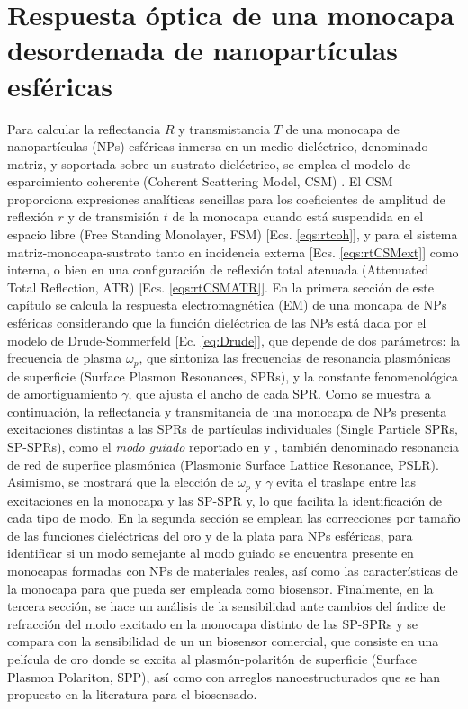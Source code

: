 \chapter{Respuesta óptica de una monocapa desordenada de nanopartículas esféricas}
\label{chapter:Resultados}


Para calcular la reflectancia $R$ y transmistancia $T$  de una monocapa de nanopartículas (NPs) esféricas inmersa en un medio dieléctrico, denominado matriz, y soportada sobre un sustrato dieléctrico, se emplea el modelo de esparcimiento coherente (Coherent Scattering Model, CSM) \cite{reyes2018analytical,garcia2012multiple}. El CSM proporciona expresiones analíticas sencillas para los coeficientes de amplitud de reflexión $r$ y de transmisión $t$ de la monocapa cuando está suspendida en el espacio libre (Free Standing Monolayer, FSM) [Ecs. \eqref{eqs:rtcoh}], y para el sistema matriz-monocapa-sustrato tanto en incidencia externa [Ecs. \eqref{eqs:rtCSMext}] como interna, o bien en una configuración de reflexión total atenuada  (Attenuated Total Reflection, ATR) [Ecs. \eqref{eqs:rtCSMATR}]. En la primera sección de este capítulo se calcula la respuesta electromagnética (EM) de una moncapa de NPs esféricas considerando que la función dieléctrica de las NPs está dada por el modelo de Drude-Sommerfeld [Ec. \eqref{eq:Drude}], que depende de dos parámetros: la frecuencia de plasma $\omega_p$, que sintoniza las frecuencias de resonancia plasmónicas de superficie (Surface Plasmon Resonances, SPRs), y la constante fenomenológica de amortiguamiento $\gamma$, que ajusta el ancho de cada SPR. Como se muestra a continuación, la reflectancia y transmitancia de una monocapa de NPs presenta excitaciones distintas a las  SPRs de partículas individuales (Single Particle SPRs, SP-SPRs), como el \emph{modo guiado} reportado en \cite{kabashin2009plasmonic} y \cite{danilov2018ultra}, también denominado resonancia de red de superfice plasmónica (Plasmonic Surface Lattice Resonance, PSLR). Asimismo, se mostrará que la elección de $\omega_p$ y $\gamma$ evita el traslape entre las excitaciones en la monocapa y las SP-SPR y, lo que facilita la identificación de cada tipo de modo. En la segunda sección se emplean las correcciones por tamaño de las funciones dieléctricas del oro y de la plata para NPs esféricas, para identificar si un modo semejante al modo guiado se encuentra presente en monocapas formadas con NPs de materiales reales, así como las  características de la monocapa para que pueda ser empleada como biosensor. Finalmente, en la tercera sección, se hace un análisis de la sensibilidad ante cambios del índice de refracción del modo excitado en la monocapa distinto de las SP-SPRs  y se compara con la sensibilidad de un un biosensor comercial, que consiste en una película de oro donde se excita al plasmón-polaritón de superficie (Surface Plasmon Polariton, SPP), así como con arreglos nanoestructurados que se han propuesto en la literatura para el biosensado.


